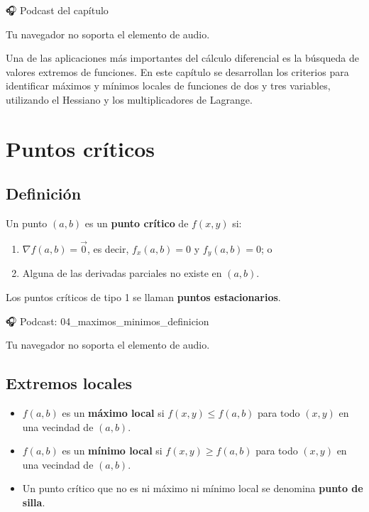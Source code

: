 \documentclass[
]{book}
\providecommand{\tightlist}{%
  \setlength{\itemsep}{0pt}\setlength{\parskip}{0pt}}
\begin{document}
🎧 Podcast del capítulo

Tu navegador no soporta el elemento de audio.

Una de las aplicaciones más importantes del cálculo diferencial es la búsqueda de valores extremos de funciones. En este capítulo se desarrollan los criterios para identificar máximos y mínimos locales de funciones de dos y tres variables, utilizando el Hessiano y los multiplicadores de Lagrange.

\section{Puntos críticos}\label{puntos-cruxedticos}

\subsection{Definición}\label{definiciuxf3n-4}

Un punto \((a, b)\) es un \textbf{punto crítico} de \(f(x, y)\) si:

\begin{enumerate}
\def\labelenumi{\arabic{enumi}.}
\tightlist
\item
  \(\nabla f(a, b) = \vec{0}\), es decir, \(f_x(a, b) = 0\) y \(f_y(a, b) = 0\); o
\item
  Alguna de las derivadas parciales no existe en \((a, b)\).
\end{enumerate}

Los puntos críticos de tipo 1 se llaman \textbf{puntos estacionarios}.

🎧 Podcast: 04\_maximos\_minimos\_definicion

Tu navegador no soporta el elemento de audio.

\subsection{Extremos locales}\label{extremos-locales}

\begin{itemize}
\tightlist
\item
  \(f(a, b)\) es un \textbf{máximo local} si \(f(x, y) \leq f(a, b)\) para todo \((x, y)\) en una vecindad de \((a, b)\).
\item
  \(f(a, b)\) es un \textbf{mínimo local} si \(f(x, y) \geq f(a, b)\) para todo \((x, y)\) en una vecindad de \((a, b)\).
\item
  Un punto crítico que no es ni máximo ni mínimo local se denomina \textbf{punto de silla}.
\end{itemize}
\end{document}

